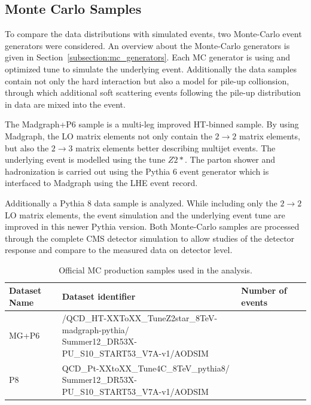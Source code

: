 \subsection{Monte Carlo Samples}

To compare the data distributions with simulated events, two Monte-Carlo event
generators were considered. An overview about the Monte-Carlo generators is
given in Section~\ref{subsection:mc_generators}. Each MC generator is using and
optimized tune to simulate the underlying event. Additionally the data samples
contain not only the hard interaction but also a model for pile-up collionsion,
through which additional soft scattering events following the pile-up
distribution in data are mixed into the event.

The Madgraph+P6 sample is a multi-leg improved HT-binned sample. By using
Madgraph, the LO matrix elements not only contain the $2 \rightarrow 2$ matrix
elements, but also the $2 \rightarrow 3$ matrix elements better describing
multijet events. The underlying event is modelled using the tune $Z2*$. The
parton shower and hadronization is carried out using the Pythia 6 event
generator which is interfaced to Madgraph using the LHE event record.

Additionally a Pythia 8 data sample is analyzed. While including only the $2
\rightarrow 2$ LO matrix elements, the event simulation and the underlying event
tune are improved in this newer Pythia version. Both Monte-Carlo samples are
processed through the complete CMS detector simulation to allow studies of the
detector response and compare to the measured data on detector level. 

\begin{table}[htp]
    \centering
    \begin{tabular}{llll}
    \toprule
    Dataset Name & Dataset identifier & Number of events\\\midrule
    MG+P6 &
    \makecell{/QCD\_HT-XXToXX\_TuneZ2star\_8TeV-madgraph-pythia/\\ Summer12\_DR53X-PU\_S10\_START53\_V7A-v1/AODSIM} & \\
    P8 & \makecell{QCD\_Pt-XXtoXX\_Tune4C\_8TeV\_pythia8/\\
    Summer12\_DR53X-PU\_S10\_START53\_V7A-v1/AODSIM} & \\
    \bottomrule
    \end{tabular}
    \caption{Official MC production samples used in the analysis.}
    \label{tab:montecarlo:datasets}
\end{table}

